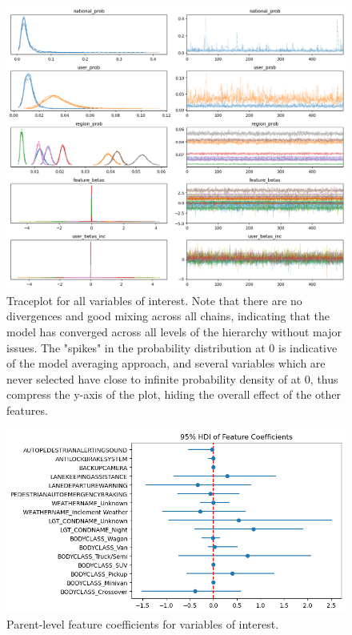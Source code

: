 \documentclass[12pt]{article}
\begin{document}
\begin{figure}[h]
    \centering
    \includegraphics[width=\textwidth]{images/traceplot.png}
    \caption{Traceplot for all variables of interest. Note that there are no divergences and good mixing across all
        chains, indicating that the model has converged across all levels of the hierarchy without major issues. 
        The "spikes" in the probability distribution at 0 is indicative of the model averaging approach, and several 
        variables which are never selected have close to infinite probability density of at 0, thus compress the y-axis
        of the plot, hiding the overall effect of the other features.}
    \label{fig:traceplot}
\end{figure}


\begin{figure}[h]
    \centering
    \includegraphics[width=\textwidth]{images/all_users_coefficients.png}
    \caption{Parent-level feature coefficients for variables of interest.}
    \label{fig:all_users}
\end{figure}
\end{document}
